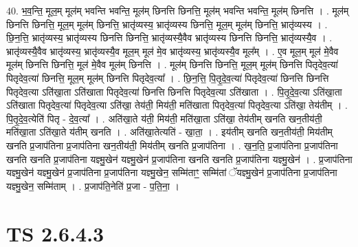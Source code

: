 \documentclass[17pt]{extarticle}
\begin{document}
40. भ॒व॒न्ति॒ मूल॒म् मूल॑म् भवन्ति भवन्ति॒ मूल॑म् छिनत्ति छिनत्ति॒ मूल॑म् भवन्ति भवन्ति॒ मूल॑म् छिनत्ति । . मूल॑म् छिनत्ति छिनत्ति॒ मूल॒म् मूल॑म् छिनत्ति॒ भ्रातृ॑व्यस्य॒ भ्रातृ॑व्यस्य छिनत्ति॒ मूल॒म् मूल॑म् छिनत्ति॒ भ्रातृ॑व्यस्य । . छि॒न॒त्ति॒ भ्रातृ॑व्यस्य॒ भ्रातृ॑व्यस्य छिनत्ति छिनत्ति॒ भ्रातृ॑व्यस्यै॒वैव भ्रातृ॑व्यस्य छिनत्ति छिनत्ति॒ भ्रातृ॑व्यस्यै॒व । . भ्रातृ॑व्यस्यै॒वैव भ्रातृ॑व्यस्य॒ भ्रातृ॑व्यस्यै॒व मूल॒म् मूल॑ मे॒व भ्रातृ॑व्यस्य॒ भ्रातृ॑व्यस्यै॒व मूल᳚म् । . ए॒व मूल॒म् मूल॑ मे॒वैव मूल॑म् छिनत्ति छिनत्ति॒ मूल॑ मे॒वैव मूल॑म् छिनत्ति । . मूल॑म् छिनत्ति छिनत्ति॒ मूल॒म् मूल॑म् छिनत्ति पितृदेव॒त्या॑ पितृदेव॒त्या॑ छिनत्ति॒ मूल॒म् मूल॑म् छिनत्ति पितृदेव॒त्या᳚ । . छि॒न॒त्ति॒ पि॒तृ॒दे॒व॒त्या॑ पितृदेव॒त्या॑ छिनत्ति छिनत्ति पितृदेव॒त्या ऽति॑खा॒ता ऽति॑खाता पितृदेव॒त्या॑ छिनत्ति छिनत्ति 
पितृदेव॒त्या ऽति॑खाता । . पि॒तृ॒दे॒व॒त्या ऽति॑खा॒ता ऽति॑खाता पितृदेव॒त्या॑ पितृदेव॒त्या ऽति॑खा॒ तेय॑ती॒ मिय॑ती॒ मति॑खाता पितृदेव॒त्या॑ 
पितृदेव॒त्या ऽति॑खा॒ तेय॑तीम् । . पि॒तृ॒दे॒व॒त्येति॑ पितृ - दे॒व॒त्या᳚ । . अति॑खा॒ते य॑ती॒ मिय॑ती॒ मति॑खा॒ता ऽति॑खा॒ तेय॑तीम् खनति खन॒तीय॑ती॒ मति॑खा॒ता ऽति॑खा॒ते य॑तीम् खनति । . अति॑खा॒तेत्यति॑ - खा॒ता॒ । . इय॑तीम् खनति खन॒तीय॑ती॒ मिय॑तीम् खनति प्र॒जाप॑तिना प्र॒जाप॑तिना खन॒तीय॑ती॒ मिय॑तीम् खनति प्र॒जाप॑तिना । . ख॒न॒ति॒ प्र॒जाप॑तिना प्र॒जाप॑तिना खनति खनति प्र॒जाप॑तिना यज्ञ्मु॒खेन॑ यज्ञ्मु॒खेन॑ प्र॒जाप॑तिना खनति खनति प्र॒जाप॑तिना यज्ञ्मु॒खेन॑ । . प्र॒जाप॑तिना यज्ञ्मु॒खेन॑ यज्ञ्मु॒खेन॑ प्र॒जाप॑तिना प्र॒जाप॑तिना यज्ञ्मु॒खेन॒ सम्मि॑ताꣳ॒॒ सम्मि॑तां ॅयज्ञ्मु॒खेन॑ प्र॒जाप॑तिना प्र॒जाप॑तिना यज्ञ्मु॒खेन॒ सम्मि॑ताम् । . प्र॒जाप॑ति॒नेति॑ प्र॒जा - प॒ति॒ना॒ । \newline
\pagebreak
{}

\section{ TS 2.6.4.3 }
\end{document}

